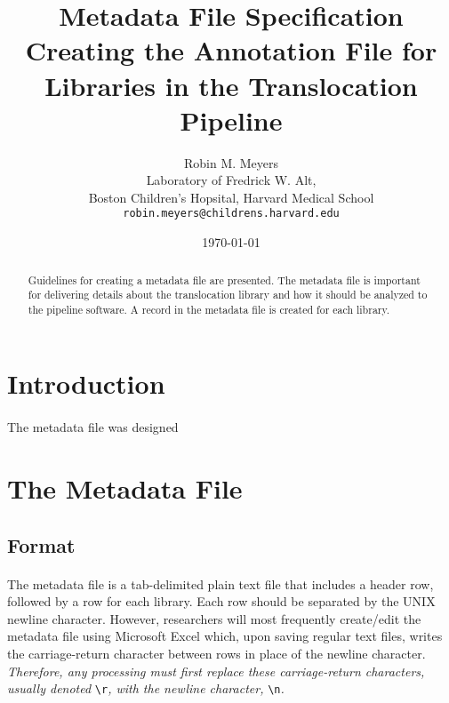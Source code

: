 \documentclass{article}
\begin{document}
\title{Metadata File Specification \\ \large Creating the Annotation File for Libraries in the Translocation Pipeline}
\author{Robin M. Meyers\\
  Laboratory of Fredrick W. Alt,\\
  Boston Children's Hopsital, Harvard Medical School\\
  \texttt{robin.meyers@childrens.harvard.edu}}
\date{\today}
\maketitle

\begin{abstract}
Guidelines for creating a metadata file are presented. The metadata file is important for delivering details about the translocation library and how it should be analyzed to the pipeline software. A record in the metadata file is created for each library.
\end{abstract}

\section{Introduction}
\paragraph{}
The metadata file was designed 

\section{The Metadata File}
\subsection{Format}
\paragraph{} The metadata file is a tab-delimited plain text file that includes a header row, followed by a row for each library. Each row should be separated by the UNIX newline character. However, researchers will most frequently create/edit the metadata file using Microsoft Excel which, upon saving regular text files, writes the carriage-return character between rows in place of the newline character. \emph{Therefore, any processing must first replace these carriage-return characters, usually denoted} \texttt{\textbackslash{}r}\emph{, with the newline character,} \texttt{\textbackslash{}n}\emph{.}
\end{document}
